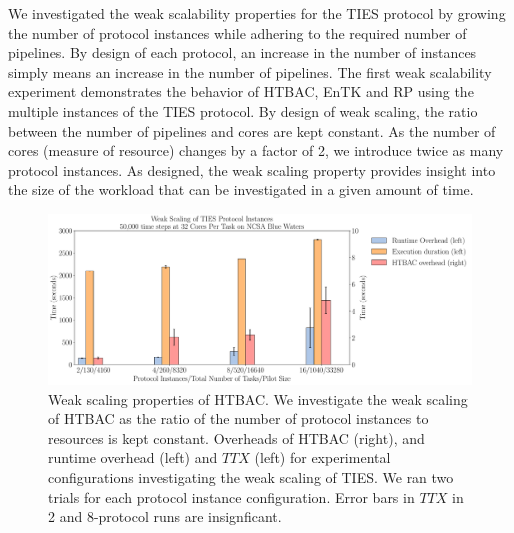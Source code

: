 


We investigated the weak scalability properties for the TIES protocol by
growing the number of protocol instances while adhering to the required number
of pipelines. By design of each protocol, an increase in the number of
instances simply means an increase in the number of pipelines. The first weak
scalability experiment demonstrates the behavior of HTBAC, EnTK and RP using
the multiple instances of the TIES protocol. By design of weak scaling, the
ratio between the number of pipelines and cores are kept constant. As the
number of cores (measure of resource) changes by a factor of 2, we introduce
twice as many protocol instances. As designed, the weak scaling property
provides insight into the size of the workload that can be investigated in a
given amount of time.

\begin{figure}
  \centering
   \includegraphics[width=\columnwidth]{./figures/weak_scaling_TIES_instances_50,000_timesteps_with_16_instances.pdf}
  \caption{Weak scaling properties of HTBAC. We investigate the
  weak scaling of HTBAC as the ratio of the number of protocol instances to
  resources is kept constant. Overheads of HTBAC (right), and runtime overhead (left) and \(TTX\) (left) for
  experimental configurations investigating the weak scaling of TIES. We ran two trials for each protocol instance configuration. Error bars in \(TTX\) in 2 and 8-protocol runs are insignficant.}
\label{fig:weak_scaling}
\end{figure}

